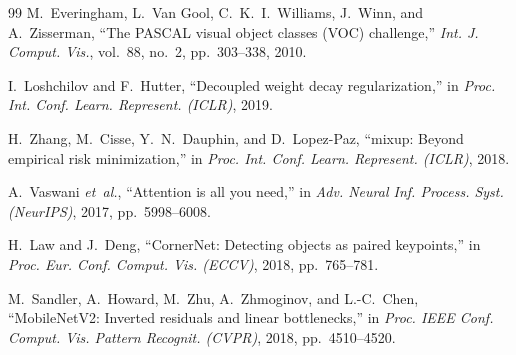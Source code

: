 \documentclass[conference]{IEEEtran}
\begin{document}
\begin{thebibliography}{99}
M.~Everingham, L.~Van Gool, C.~K.~I.~Williams, J.~Winn, and
A.~Zisserman, ``The PASCAL visual object classes (VOC)
challenge,'' \textit{Int. J. Comput. Vis.}, vol.~88, no.~2,
pp.~303--338, 2010.

I.~Loshchilov and F.~Hutter, ``Decoupled weight decay
regularization,'' in \textit{Proc. Int. Conf. Learn. Represent.
(ICLR)}, 2019.

H.~Zhang, M.~Cisse, Y.~N.~Dauphin, and D.~Lopez-Paz, ``mixup:
Beyond empirical risk minimization,'' in \textit{Proc. Int.
Conf. Learn. Represent. (ICLR)}, 2018.

A.~Vaswani \textit{et~al.}, ``Attention is all you need,'' in
\textit{Adv. Neural Inf. Process. Syst. (NeurIPS)}, 2017,
pp.~5998--6008.

H.~Law and J.~Deng, ``CornerNet: Detecting objects as paired
keypoints,'' in \textit{Proc. Eur. Conf. Comput. Vis. (ECCV)},
2018, pp.~765--781.

M.~Sandler, A.~Howard, M.~Zhu, A.~Zhmoginov, and L.-C.~Chen,
``MobileNetV2: Inverted residuals and linear bottlenecks,'' in
\textit{Proc. IEEE Conf. Comput. Vis. Pattern Recognit.
(CVPR)}, 2018, pp.~4510--4520.

\end{thebibliography}
\end{document}
